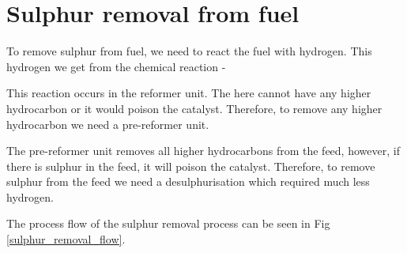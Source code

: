 \documentclass{report}
\begin{document}
	\section{Sulphur removal from fuel}
	To remove sulphur from fuel, we need to react the fuel with hydrogen. This hydrogen we get from the chemical reaction - \par
	\par
	This reaction occurs in the reformer unit.
	The  here cannot have any higher hydrocarbon or it would poison the catalyst. Therefore, to remove any higher hydrocarbon we need a pre-reformer unit.\par
	The pre-reformer unit removes all higher hydrocarbons from the  feed, however, if there is sulphur in the feed, it will poison the catalyst. Therefore, to remove sulphur from the feed we need a desulphurisation which required much less hydrogen.
	
	The process flow of the sulphur removal process can be seen in Fig \ref{sulphur_removal_flow}.
	\clearpage
	\pagebreak
\end{document}
